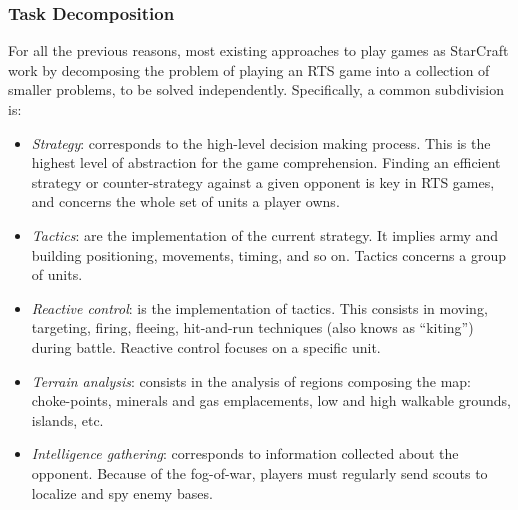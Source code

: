 \documentclass{llncs}
\begin{document}
\subsubsection{Task Decomposition}
For all the  previous reasons, most existing approaches  to play games
as StarCraft  work by decomposing the  problem of playing an  RTS game
into   a    collection   of    smaller   problems,   to    be   solved
independently. Specifically, a common subdivision is:
\begin{itemize}
\item {\em  Strategy}: corresponds  to the high-level  decision making
  process.  This is  the highest  level  of abstraction  for the  game
  comprehension.  Finding an  efficient  strategy or  counter-strategy
  against a given opponent is key in RTS games, and concerns the whole
  set of units a player
  owns. %
\item   {\em  Tactics}:   are  the   implementation  of   the  current
  strategy.  It  implies  army and  building  positioning,  movements,
  timing, and so on. Tactics concerns a group of
  units. %
\item {\em Reactive  control}: is the implementation  of tactics. This
  consists   in  moving,   targeting,  firing,   fleeing,  hit-and-run
  techniques  (also  knows  as  ``kiting'')  during  battle.  Reactive
  control focuses on a specific
  unit. %
%
\item  {\em Terrain  analysis}: consists  in the  analysis of  regions
  composing the map: choke-points,  minerals and gas emplacements, low
  and high walkable grounds, islands, etc.
\item  {\em   Intelligence  gathering}:  corresponds   to  information
  collected  about the  opponent. Because  of the  fog-of-war, players
  must regularly send scouts to localize and spy enemy
  bases.%
\end{itemize}
\end{document}
